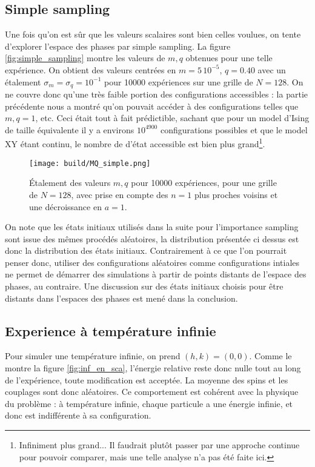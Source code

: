 \documentclass[a4paper, 11pt]{article}
\begin{document}
\subsection{Simple sampling}

Une fois qu'on est sûr que les valeurs scalaires sont bien celles voulues, on tente d'explorer
l'espace des phases par simple sampling. La figure \ref{fig:simple_sampling} montre les valeurs de
$m, q$ obtenues pour une telle expérience. On obtient des valeurs centrées en $m=5\,10^{-5}$,
$q=0.40$ avec un étalement $\sigma_m = \sigma_q = 10^{-1}$ pour 10000 expériences sur une grille de
$N=128$. On ne couvre donc qu'une très faible portion des configurations accessibles : la partie
précédente nous a montré qu'on pouvait accéder à des configurations telles que $m, q = 1$, etc. Ceci
était tout à fait prédictible, sachant que pour un model d'Ising de taille équivalente il y a
environs $10^{4900}$ configurations possibles et que le model XY étant continu, le nombre de d'état
accessible est bien plus grand\footnote{Infiniment plus grand... Il faudrait plutôt passer par une
approche continue pour pouvoir comparer, mais une telle analyse n'a pas été faite ici.}.

\begin{figure}  
    \centering
    \texttt{[image: build/MQ\_simple.png]}
    \caption{Étalement des valeurs $m, q$ pour 10000 expériences, pour une grille de
    $N=128$, avec prise en compte des $n=1$ plus proches voisins et une décroissance en $a=1$.}
\end{figure}

On note que les états initiaux utilisés dans la suite pour l'importance sampling sont issue des
mêmes procédés aléatoires, la distribution présentée ci dessus est donc la distribution des états
initiaux. Contrairement à ce que l'on pourrait penser donc, utiliser des configurations aléatoires
comme configurations intiales ne permet de démarrer des simulations à partir de points distants de
l'espace des phases, au contraire. Une discussion sur des états initiaux choisis pour être distants
dans l'espaces des phases est mené dans la conclusion.

\subsection{Experience à température infinie}

Pour simuler une température infinie, on prend $(h, k) = (0, 0)$. Comme le montre la figure
\ref{fig:inf_en_sca}, l'énergie relative reste donc nulle tout au long de l'expérience, toute
modification est acceptée. La moyenne des spins et les couplages sont donc aléatoires. Ce
comportement est cohérent avec la physique du problème : à température infinie, chaque particule a
une énergie infinie, et donc est indifférente à sa configuration. 
\end{document}
